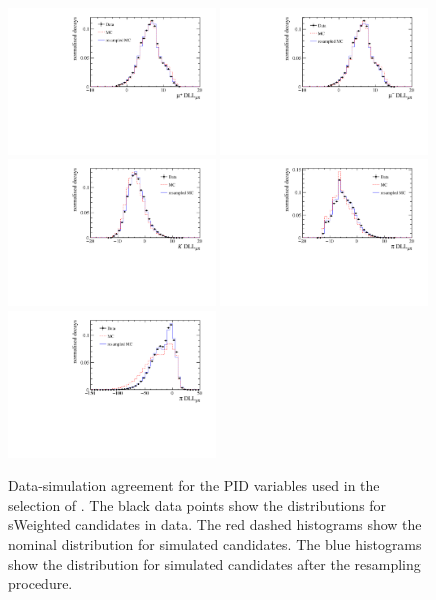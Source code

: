 \begin{figure}[!hb]
 \centering
 \includegraphics[width=0.49\textwidth]{figs/kpimm/data-mc/resampling/Muplus_PIDmu.pdf}
 \includegraphics[width=0.49\textwidth]{figs/kpimm/data-mc/resampling/Muminus_PIDmu.pdf}
 \includegraphics[width=0.49\textwidth]{figs/kpimm/data-mc/resampling/K_PIDmu.pdf}
 \includegraphics[width=0.49\textwidth]{figs/kpimm/data-mc/resampling/Pi_PIDmu.pdf}
 \includegraphics[width=0.49\textwidth]{figs/kpimm/data-mc/resampling/Pi_PIDp.pdf}
 \caption{Data-simulation agreement for the PID variables used in the selection of \BdToKpimm. The black data points show the distributions for sWeighted \BdToJPsiKst candidates in data. The red dashed histograms show the nominal distribution for simulated \BdToJPsiKst candidates. The blue histograms show the distribution for simulated \BdToJPsiKst candidates after the resampling procedure.}
\label{fig:appendix:data-mc:pid}
\end{figure}

